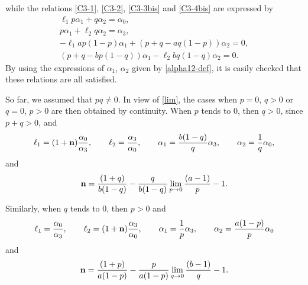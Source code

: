 \documentclass[pdftex]{sigma}
\numberwithin{equation}{section}
\begin{document}
while the relations \eqref{C3-1}, \eqref{C3-2}, \eqref{C3-3bis} and \eqref{C3-4bis} are expressed by
\begin{gather} \ell _1 p \alpha _1 + q \alpha _2 = \alpha _0, \label{R1}\\
 p \alpha _1 + \ell _2 q \alpha _2 = \alpha _3, \label{R2}\\
 - \ell _1 a p (1 - p) \alpha _1 + (p + q - a q (1 - p)) \alpha _2 = 0, \label{R3}\\
 (p + q - b p (1 - q)) \alpha _1 - \ell _2 b q (1 - q) \alpha _2 = 0.\label{R4} \end{gather}
By using the expressions of $\alpha _1$, $\alpha _2$ given by \eqref{alpha12-def}, it is easily checked that these relations are all satisfied.

 So far, we assumed that $p q \neq 0$. In view of \eqref{lim}, the cases when $p = 0$, $q > 0$ or $q = 0$, $p > 0$ are then obtained by continuity. When $p$ tends to $0$, then $q > 0$, since $p + q > 0$, and
\begin{gather*} \ell _1 = (1 + {\bf n}) \frac{\alpha _0}{\alpha _3}, \qquad \ell _2 = \frac{\alpha _3}{\alpha _0}, \qquad
 \alpha _1 = \frac{b (1 - q)}{q} \alpha _3, \qquad \alpha _2 = \frac{1}{q} \alpha _0, \end{gather*}
and
\begin{gather*} {\bf n} = \frac{(1 + q)}{b (1 - q)} - \frac{q}{b (1 - q)} \lim _{p \to 0}{\frac{(a - 1)}{p}} - 1. \end{gather*}

Similarly, when $q$ tends to $0$, then $p > 0$ and
\begin{gather*} \ell _1 = \frac{\alpha _0}{\alpha _3}, \qquad \ell _2 = (1 + {\bf n}) \frac{\alpha _3}{\alpha _0}, \qquad
 \alpha _1 = \frac{1}{p} \alpha _3, \qquad \alpha _2 = \frac{a (1 - p)}{p} \alpha _0 \end{gather*}
and
\begin{gather*} {\bf n} = \frac{(1 + p)}{a (1 - p)} - \frac{p}{a (1 - p)} \lim _{q \to 0}{\frac{(b - 1)}{q}} - 1. \end{gather*}
\end{document}
